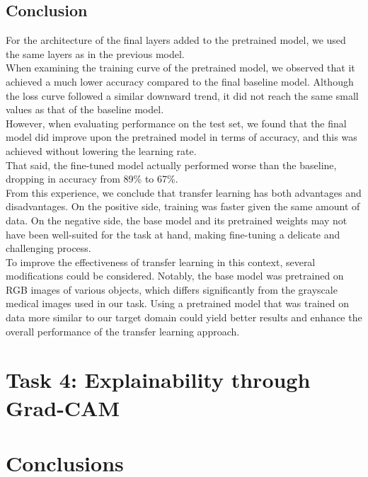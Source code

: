 \documentclass[conference]{IEEEtran}
\begin{document}
\subsection{Conclusion}
For the architecture of the final layers added to the pretrained model, we used the same layers as in the previous model.\\

When examining the training curve of the pretrained model, we observed that it achieved a much lower accuracy compared to the final baseline model. Although the loss curve followed a similar downward trend, it did not reach the same small values as that of the baseline model.\\

However, when evaluating performance on the test set, we found that the final model did improve upon the pretrained model in terms of accuracy, and this was achieved without lowering the learning rate.\\

That said, the fine-tuned model actually performed worse than the baseline, dropping in accuracy from 89\% to 67\%.\\

From this experience, we conclude that transfer learning has both advantages and disadvantages. On the positive side, training was faster given the same amount of data. On the negative side, the base model and its pretrained weights may not have been well-suited for the task at hand, making fine-tuning a delicate and challenging process.\\

To improve the effectiveness of transfer learning in this context, several modifications could be considered. Notably, the base model was pretrained on RGB images of various objects, which differs significantly from the grayscale medical images used in our task. Using a pretrained model that was trained on data more similar to our target domain could yield better results and enhance the overall performance of the transfer learning approach.\\






\section{Task 4: Explainability through Grad-CAM} \label{sec:task_4}



\section{Conclusions}\label{sec:conclusions}
\end{document}
